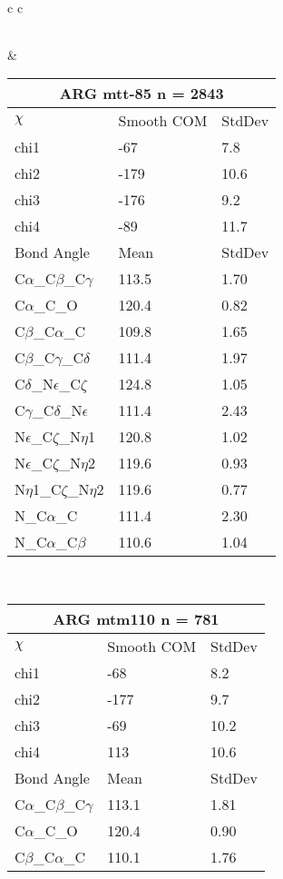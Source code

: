 \begin{longtable}{ c c }
\begin{tabular}{ l l l }
  \bottomrule
  \end{tabular}
  &
  \begin{tabular}{ l l l }
  \toprule
  \multicolumn{3}{c}{ARG \textbf{mtt-85} n = 2843} \\ \toprule
  $\chi$       & Smooth COM & StdDev \\ \midrule
  chi1 & -67 & 7.8 \\ 
  chi2 & -179 & 10.6 \\ 
  chi3 & -176 & 9.2 \\ 
  chi4 & -89 & 11.7 \\ \midrule
  Bond Angle   & Mean     & StdDev \\ \midrule
  C$\alpha$\_C$\beta$\_C$\gamma$ & 113.5 & 1.70\\
  C$\alpha$\_C\_O & 120.4 & 0.82\\
  C$\beta$\_C$\alpha$\_C & 109.8 & 1.65\\
  C$\beta$\_C$\gamma$\_C$\delta$ & 111.4 & 1.97\\
  C$\delta$\_N$\epsilon$\_C$\zeta$ & 124.8 & 1.05\\
  C$\gamma$\_C$\delta$\_N$\epsilon$ & 111.4 & 2.43\\
  N$\epsilon$\_C$\zeta$\_N$\eta$1 & 120.8 & 1.02\\
  N$\epsilon$\_C$\zeta$\_N$\eta$2 & 119.6 & 0.93\\
  N$\eta$1\_C$\zeta$\_N$\eta$2 & 119.6 & 0.77\\
  N\_C$\alpha$\_C & 111.4 & 2.30\\
  N\_C$\alpha$\_C$\beta$ & 110.6 & 1.04\\
  \bottomrule
  \end{tabular}
  \\
  \begin{tabular}{ l l l }
  \toprule
  \multicolumn{3}{c}{ARG \textbf{mtm110} n = 781} \\ \toprule
  $\chi$       & Smooth COM & StdDev \\ \midrule
  chi1 & -68 & 8.2 \\ 
  chi2 & -177 & 9.7 \\ 
  chi3 & -69 & 10.2 \\ 
  chi4 & 113 & 10.6 \\ \midrule
  Bond Angle   & Mean     & StdDev \\ \midrule
  C$\alpha$\_C$\beta$\_C$\gamma$ & 113.1 & 1.81\\
  C$\alpha$\_C\_O & 120.4 & 0.90\\
  C$\beta$\_C$\alpha$\_C & 110.1 & 1.76\\

\end{tabular}
\end{longtable}
